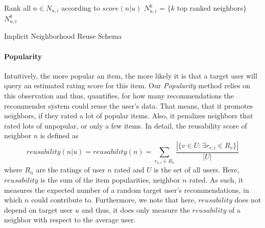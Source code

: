 \documentclass[manuscript,review,anonymous]{acmart}
\begin{document}
\begin{algorithm}[!htb]
    \SetAlgoLined
    \DontPrintSemicolon
    Rank all $n \in N_{u, i}$ according to $score(n|u)$ 
    $N^k_{u, i}$ = $\{k$ top ranked neighbors$\}$ \\
    \Return $N^k_{u, i}$
    \caption{Implicit Neighborhood Reuse Schema}
    \label{algo:implicit_neighborhood}
\end{algorithm}

\paragraph{Popularity}
Intuitively, the more popular an item, the more likely it is that a target user will query an estimated rating score for this item.
Our \emph{Popularity} method relies on this observation and thus, quantifies, for how many recommendations the recommender system could reuse the user's data.
That means, that it promotes neighbors, if they rated a lot of popular items.
Also, it penalizes neighbors that rated lots of unpopular, or only a few items.
In detail, the reusability score of neighbor $n$ is defined as
\begin{equation}
    reusability(n|u) = reusability(n) = \sum_{r_{n, i} \in R_n} \frac{|\{ v \in U: \exists r_{v, i} \in R_v \}|}{|U|}
\end{equation}
where $R_n$ are the ratings of user $n$ rated and $U$ is the set of all users.
Here, $reusability$ is the sum of the item popularities, neighbor $n$ rated.
As such, it measures the expected number of a random target user's recommendations, in which $n$ could contribute to.
Furthermore, we note that here, $reusability$ does not depend on target user $u$ and thus, it does only measure the $reusability$ of a neighbor with respect to the average user.
\end{document}
